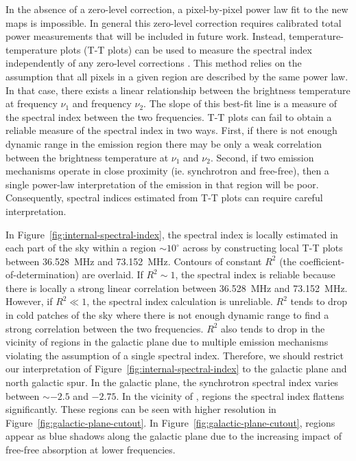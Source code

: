 \documentclass[twocolumn]{aastex61}
\begin{document}
In the absence of a zero-level correction, a pixel-by-pixel power law fit to the new maps is
impossible. In general this zero-level correction requires calibrated total power measurements that
will be included in future work.  Instead, temperature-temperature plots (T-T plots) can be used to
measure the spectral index independently of any zero-level corrections \citep{1962MNRAS.124..297T}.
This method relies on the assumption that all pixels in a given region are described by the same
power law. In that case, there exists a linear relationship between the brightness temperature at
frequency $\nu_1$ and frequency $\nu_2$. The slope of this best-fit line is a measure of the
spectral index between the two frequencies. T-T plots can fail to obtain a reliable measure of the
spectral index in two ways.  First, if there is not enough dynamic range in the emission region
there may be only a weak correlation between the brightness temperature at $\nu_1$ and $\nu_2$.
Second, if two emission mechanisms operate in close proximity (ie.  synchrotron and free-free), then
a single power-law interpretation of the emission in that region will be poor. Consequently,
spectral indices estimated from T-T plots can require careful interpretation.

In Figure~\ref{fig:internal-spectral-index}, the spectral index is locally estimated in each part of
the sky within a region $\sim10^\circ$ across by constructing local T-T plots between 36.528~MHz and
73.152~MHz. Contours of constant $R^2$ (the coefficient-of-determination) are overlaid. If $R^2\sim
1$, the spectral index is reliable because there is locally a strong linear correlation between
36.528~MHz and 73.152~MHz. However, if $R^2\ll 1$, the spectral index calculation is unreliable.
$R^2$ tends to drop in cold patches of the sky where there is not enough dynamic range to find a
strong correlation between the two frequencies. $R^2$ also tends to drop in the vicinity of
 regions in the galactic plane due to multiple emission mechanisms violating the
assumption of a single spectral index. Therefore, we should restrict our interpretation of
Figure~\ref{fig:internal-spectral-index} to the galactic plane and north galactic spur. In the
galactic plane, the synchrotron spectral index varies between $\sim-2.5$ and $-2.75$. In the
vicinity of , regions the spectral index flattens significantly.  These  regions
can be seen with higher resolution in Figure~\ref{fig:galactic-plane-cutout}. In
Figure~\ref{fig:galactic-plane-cutout},  regions appear as blue shadows along the galactic
plane due to the increasing impact of free-free absorption at lower frequencies.
\end{document}

